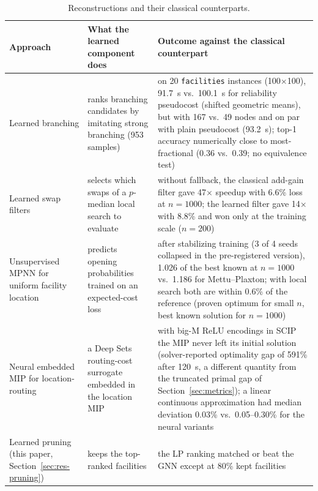 \begin{table}[h]\centering\small
\caption{Reconstructions and their classical counterparts.}\label{tab:recon}
\begin{tabular}{p{3.0cm}p{4.3cm}p{6.2cm}}
\toprule
Approach & What the learned component does & Outcome against the classical counterpart \\
\midrule
Learned branching \citep{gasse2019,gupta2020} & ranks branching candidates by imitating strong
branching (953 samples) & on 20 \texttt{facilities} instances (100$\times$100), 91.7~s vs.\
100.1~s for reliability pseudocost (shifted geometric means), but with 167 vs.\ 49 nodes and on
par with plain pseudocost (93.2~s); top-1 accuracy numerically close to most-fractional (0.36 vs.\ 0.39; no equivalence test) \\
Learned swap filters \citep{guo2023swap,su2024urban} & selects which swaps of a $p$-median local
search to evaluate & without fallback, the classical add-gain filter gave 47$\times$ speedup with
6.6\% loss at $n=1000$; the learned filter gave 14$\times$ with 8.8\% and won only at the training
scale ($n=200$) \\
Unsupervised MPNN for uniform facility location \citep{qian2026unifl} & predicts opening
probabilities trained on an expected-cost loss & after stabilizing training (3 of 4 seeds
collapsed in the pre-registered version), 1.026 of the best known at $n=1000$ vs.\ 1.186 for
Mettu--Plaxton; with local search both are within 0.6\% of the reference (proven optimum for small $n$, best
known solution for $n=1000$) \\
Neural embedded MIP for location-routing \citep{kaleem2024neo} & a Deep Sets routing-cost
surrogate embedded in the location MIP & with big-M ReLU encodings in SCIP the MIP never left its
initial solution (solver-reported optimality gap of 591\% after 120~s, a different quantity from the truncated
primal gap of Section~\ref{sec:metrics}); a linear continuous approximation had median
deviation 0.03\% vs.\ 0.05--0.30\% for the neural variants \\
Learned pruning (this paper, Section~\ref{sec:res-pruning}) & keeps the top-ranked facilities &
the LP ranking matched or beat the GNN except at 80\% kept facilities \\
\bottomrule
\end{tabular}
\end{table}

